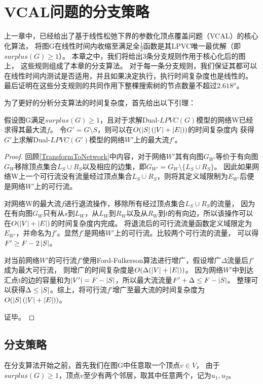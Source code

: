 \section{VCAL问题的分支策略}
上一章中，已经给出了基于线性松弛下界的参数化顶点覆盖问题（VCAL）的核心化算法，
将图G在线性时间内收缩至满足全$\frac{1}{2}$函数是其LPVC唯一最优解（即$surplus(G) \ge 1$）。
本章之中，我们将给出3条分支规则作用于核心化后的图上，
这些规则组成了本章的分支算法。
对于每一条分支规则，我们保证其都可以在线性时间内测试是否适用，并且如果决定执行，执行时间复杂度也是线性的。
最后证明在这些分支规则的共同作用下整棵搜索树的节点数量不超过$2.618^\mu$。

\vspace{0.5cm}
为了更好的分析分支算法的时间复杂度，首先给出以下引理：
\begin{lemma} \label{LemmaUpdateMaxflow}
假设图G满足$surplus(G) \ge 1$，且对于求解Dual-$LPVC(G)$模型的网络W已经求得其最大流$f$。
令$G' = G \setminus S$，则可以在$O(\left\vert S \right\vert(\left\vert V \right\vert + \left\vert E \right\vert))$的时间复杂度内
获得$G'$上求解Dual-$LPVC(G')$模型的网络$W'$上的最大流$f'$。
\end{lemma}

\begin{proof}
回顾\ref{TransformToNetwork}中内容，对于网络$W'$其有向图$G_{W'}$等价于有向图$G_W$移除顶点集合$L_S \cup R_S$以及相应的边集，即$G_{W'} = G_W \setminus \{L_S \cup R_S\}$。
因此如果网络W上一个可行流没有流量经过顶点集合$L_S \cup R_S$，则将其定义域限制为$E_{W'}$后便是网络$W'$上的可行流。

对网络W的最大流$f$进行退流操作，移除所有经过顶点集合$L_S \cup R_S$的流量，
因为在有向图$G_W$只有从$s$到$L_W$，从$L_W$到$R_W$以及从$R_W$到$t$的有向边，所以该操作可以在$O(\left\vert V \right\vert + \left\vert E \right\vert)$的时间复杂度内完成。
将退流后的可行流流量函数定义域限定为$E_{W'}$，并命名为$f'$。显然$f'$是网络$W'$上的可行流。比较两个可行流的流量，
可以得$F' \ge F - 2 \left\vert S \right\vert$。

对当前网络$W'$的可行流$f'$使用Ford-Fulkerson算法进行增广，假设增广$\Delta$流量后$f'$成为最大可行流，
则增广的时间复杂度是$O(\Delta(\left\vert V \right\vert + \left\vert E \right\vert))$。
因为网络$W'$中到达汇点t的边的容量和为$\left\vert V' \right\vert = F - \left\vert S \right\vert$，所以最大流流量$F' + \Delta \le F - \left\vert S \right\vert$。
整理可以获得$\Delta \le \left\vert S \right\vert$。综上，将可行流$f'$增广至最大流的时间复杂度为$O(\left\vert S \right\vert(\left\vert V \right\vert + \left\vert E \right\vert))$。

证毕。
\end{proof}


\subsection{分支策略}
在分支算法开始之前，首先我们在图G中任意取一个顶点$v \in V$，
由于$surplus(G) \ge 1$，顶点$v$至少有两个邻居，取其中任意两个，记为$u_1, u_2$。


